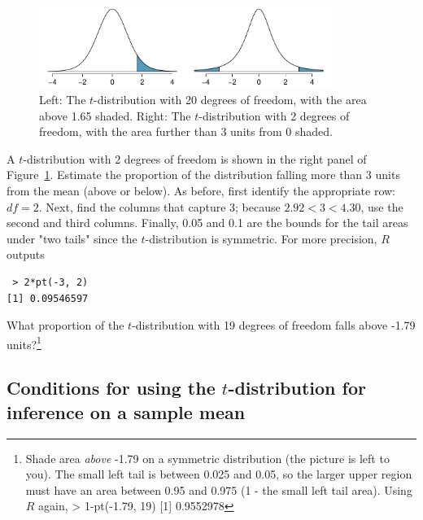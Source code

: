 \begin{figure}
\centering
\includegraphics[width=0.85\textwidth]{ch_inference_foundations_oi_biostat/figures/tDistDF20RightTail1Point65/tDistDF20RightTail1Point65}
\caption{Left: The $t$-distribution with 20 degrees of freedom, with the area above 1.65 shaded. Right: The $t$-distribution with 2 degrees of freedom, with the area further than 3 units from 0 shaded.}
\label{tDistDF20RightTail1Point65}
\end{figure}

\begin{example}{A $t$-distribution with 2 degrees of freedom is shown in the right panel of Figure~\ref{tDistDF20RightTail1Point65}. Estimate the proportion of the distribution falling more than 3 units from the mean (above or below).}
As before, first identify the appropriate row: $df=2$. Next, find the columns that capture 3; because $2.92 < 3 < 4.30$, use the second and third columns. Finally, 0.05 and 0.1 are the bounds for the tail areas under "two tails" since the $t$-distribution is symmetric. For more precision, $R$ outputs 
\begin{verbatim} > 2*pt(-3, 2)
[1] 0.09546597
\end{verbatim}
\end{example}

\begin{exercise}
What proportion of the $t$-distribution with 19 degrees of freedom falls above -1.79 units?\footnote{Shade area \emph{above} -1.79 on a symmetric distribution (the picture is left to you). The small left tail is between 0.025 and 0.05, so the larger upper region must have an area between 0.95 and 0.975 (1 - the small left tail area). Using $R$ again, > 1-pt(-1.79, 19) [1] 0.9552978}


\end{exercise}

\subsection{Conditions for using the $t$-distribution for inference on a sample mean}
\label{tDistSolutionToSEProblem}

